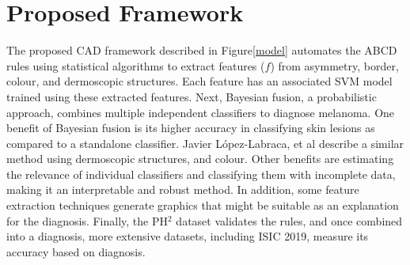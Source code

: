 \section{Proposed Framework}
The proposed CAD framework described in Figure\ref{model} automates the ABCD rules using statistical algorithms to extract features ($f$) from asymmetry, border, colour, and dermoscopic structures. Each feature has an associated SVM model trained using these extracted features. Next, Bayesian fusion, a probabilistic approach, combines multiple independent classifiers to diagnose melanoma. One benefit of Bayesian fusion is its higher accuracy in classifying skin lesions as compared to a standalone classifier\cite{Takruri2017}.  Javier López-Labraca, et al describe a similar method using dermoscopic structures, and colour\cite{Lopez-Labraca2018}. Other benefits are estimating the relevance of individual classifiers and classifying them with incomplete data, making it an interpretable and robust method. In addition, some feature extraction techniques generate graphics that might be suitable as an explanation for the diagnosis. Finally, the PH$^2$ dataset validates the rules, and once combined into a diagnosis, more extensive datasets, including ISIC 2019, measure its accuracy based on diagnosis.

